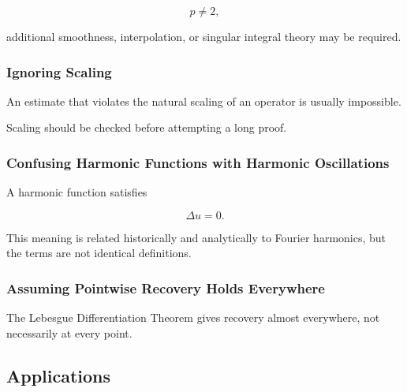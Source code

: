 \[
p\neq2,
\]

additional smoothness, interpolation, or singular integral theory may be
required.

\subsubsection{Ignoring Scaling}

An estimate that violates the natural scaling of an operator is usually
impossible.

Scaling should be checked before attempting a long proof.

\subsubsection{Confusing Harmonic Functions with Harmonic Oscillations}

A harmonic function satisfies

\[
\Delta u=0.
\]

This meaning is related historically and analytically to Fourier
harmonics, but the terms are not identical definitions.

\subsubsection{Assuming Pointwise Recovery Holds Everywhere}

The Lebesgue Differentiation Theorem gives recovery almost everywhere,
not necessarily at every point.

\subsection{Applications}
\label{subsec:harmonic-analysis-applications}

